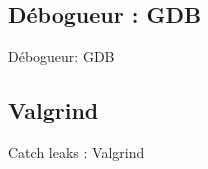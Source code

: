 \subsection{Débogueur : GDB}
\begin{frame}{Débogueur: GDB}
	
\end{frame}

\subsection{Valgrind}
\begin{frame}{Catch leaks : Valgrind}
	
\end{frame}